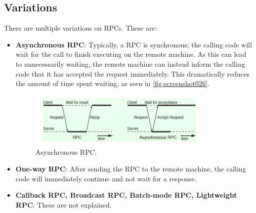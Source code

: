 \subsection{Variations}
There are multiple variations on RPCs. These are: \begin{itemize}
\item \textbf{Asynchronous RPC}: Typically, a RPC is synchronous; the calling code will wait for the call to finish executing on the remote machine. As this can lead to unnecessarily waiting, the remote machine can instead inform the calling code that it has accepted the request immediately. This dramatically reduces the amount of time spent waiting, as seen in \autoref{fig:screenshot026}. \begin{figure}
\centering
\includegraphics[width=0.7\linewidth]{figures/screenshot026}
\caption{Asynchronous RPC.}
\label{fig:screenshot026}
\end{figure}
\item \textbf{One-way RPC}: After sending the RPC to the remote machine, the calling code will immediately continue and not wait for a response.
\item \textbf{Callback RPC, Broadcast RPC, Batch-mode RPC, Lightweight RPC}: These are not explained.
\end{itemize}


